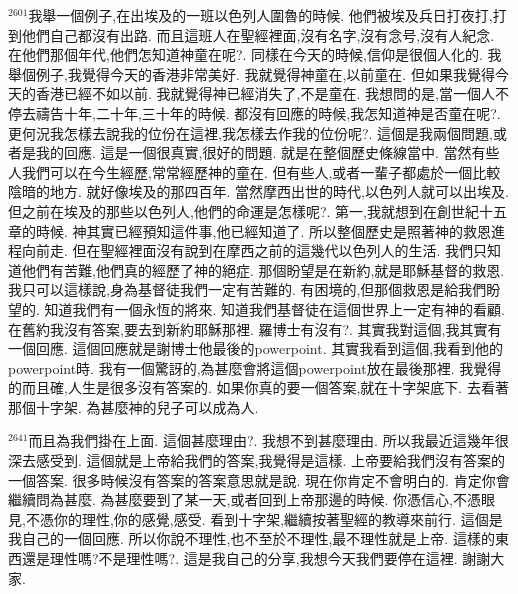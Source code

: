 \documentclass{book}
\begin{document}
$^{2601}$我舉一個例子,在出埃及的一班以色列人圍魯的時候.
他們被埃及兵日打夜打,打到他們自己都沒有出路.
而且這班人在聖經裡面,沒有名字,沒有念号,沒有人紀念.
在他們那個年代,他們怎知道神童在呢?.
同樣在今天的時候,信仰是很個人化的.
我舉個例子,我覺得今天的香港非常美好.
我就覺得神童在,以前童在.
但如果我覺得今天的香港已經不如以前.
我就覺得神已經消失了,不是童在.
我想問的是,當一個人不停去禱告十年,二十年,三十年的時候.
都沒有回應的時候,我怎知道神是否童在呢?.
更何況我怎樣去說我的位份在這裡,我怎樣去作我的位份呢?.
這個是我兩個問題,或者是我的回應.
這是一個很真實,很好的問題.
就是在整個歷史條線當中.
當然有些人我們可以在今生經歷,常常經歷神的童在.
但有些人,或者一輩子都處於一個比較陰暗的地方.
就好像埃及的那四百年.
當然摩西出世的時代,以色列人就可以出埃及.
但之前在埃及的那些以色列人,他們的命運是怎樣呢?.
第一,我就想到在創世紀十五章的時候.
神其實已經預知這件事,他已經知道了.
所以整個歷史是照著神的救恩進程向前走.
但在聖經裡面沒有說到在摩西之前的這幾代以色列人的生活.
我們只知道他們有苦難,他們真的經歷了神的絕症.
那個盼望是在新約,就是耶穌基督的救恩.
我只可以這樣說,身為基督徒我們一定有苦難的.
有困境的,但那個救恩是給我們盼望的.
知道我們有一個永恆的將來.
知道我們基督徒在這個世界上一定有神的看顧.
在舊約我沒有答案,要去到新約耶穌那裡.
羅博士有沒有?.
其實我對這個,我其實有一個回應.
這個回應就是謝博士他最後的powerpoint.
其實我看到這個,我看到他的powerpoint時.
我有一個驚訝的,為甚麼會將這個powerpoint放在最後那裡.
我覺得的而且確,人生是很多沒有答案的.
如果你真的要一個答案,就在十字架底下.
去看著那個十字架.
為甚麼神的兒子可以成為人.

$^{2641}$而且為我們掛在上面.
這個甚麼理由?.
我想不到甚麼理由.
所以我最近這幾年很深去感受到.
這個就是上帝給我們的答案,我覺得是這樣.
上帝要給我們沒有答案的一個答案.
很多時候沒有答案的答案意思就是說.
現在你肯定不會明白的.
肯定你會繼續問為甚麼.
為甚麼要到了某一天,或者回到上帝那邊的時候.
你憑信心,不憑眼見,不憑你的理性,你的感覺,感受.
看到十字架,繼續按著聖經的教導來前行.
這個是我自己的一個回應.
所以你說不理性,也不至於不理性,最不理性就是上帝.
這樣的東西還是理性嗎?不是理性嗎?.
這是我自己的分享,我想今天我們要停在這裡.
謝謝大家.
\newpage
\end{document}
